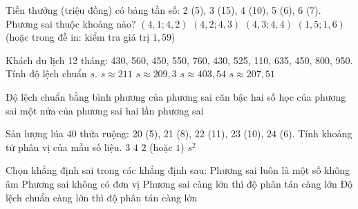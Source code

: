 \begin{ex}
	Tiền thưởng (triệu đồng) có bảng tần số: 2 (5), 3 (15), 4 (10), 5 (6), 6 (7). Phương sai thuộc khoảng nào?
	\choice
	{$(4{,}1; 4{,}2)$}
	{$(4{,}2; 4{,}3)$}
	{$(4{,}3; 4{,}4)$}
	{\True $(1{,}5; 1{,}6)$ (hoặc trong đề in: kiểm tra giá trị $1{,}59$)}
\end{ex}

\begin{ex}
	Khách du lịch 12 tháng: 430, 560, 450, 550, 760, 430, 525, 110, 635, 450, 800, 950. Tính độ lệch chuẩn $s$.
	\choice
	{\True $s \approx 211$}
	{$s \approx 209{,}3$}
	{$s \approx 403{,}54$}
	{$s \approx 207{,}51$}
\end{ex}

\begin{ex}
	Độ lệch chuẩn bằng
	\choice
	{bình phương của phương sai}
	{\True căn bậc hai số học của phương sai}
	{một nửa của phương sai}
	{hai lần phương sai}
\end{ex}

\begin{ex}
	Sản lượng lúa 40 thửa ruộng: 20 (5), 21 (8), 22 (11), 23 (10), 24 (6). Tính khoảng tứ phân vị của mẫu số liệu.
	\choice
	{$3$}
	{$4$}
	{\True $2$ (hoặc $1$)}
	{$s^2$}
\end{ex}

\begin{ex}
	Chọn khẳng định sai trong các khẳng định sau:
	\choice
	{Phương sai luôn là một số không âm}
	{\True Phương sai không có đơn vị}
	{Phương sai càng lớn thì độ phân tán càng lớn}
	{Độ lệch chuẩn càng lớn thì độ phân tán càng lớn}
\end{ex}

